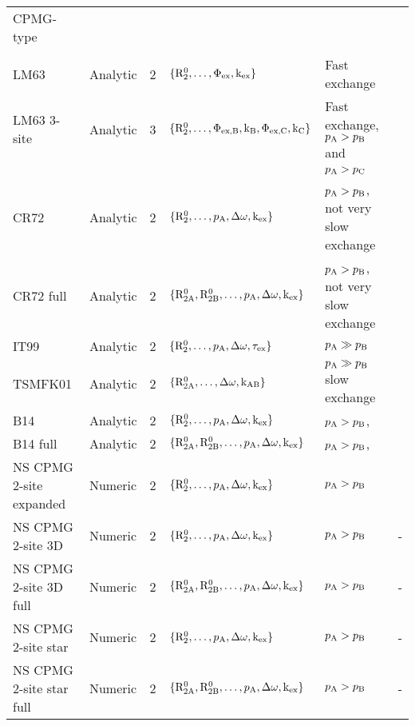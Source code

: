 \begin{center}
\begin{small}
\begin{longtable}{llllll}
\\[-5pt]
CPMG-type \\
\cline{1-1}
\\[-5pt]
LM63                     & Analytic & 2     & $\{\mathrm{R}_2^0, \dots, \Phi_{\textrm{ex}}, \textrm{k}_{\textrm{ex}}\}$                & Fast exchange                     & \citet{LuzMeiboom63} \\
LM63 3-site              & Analytic & 3     & $\{\mathrm{R}_2^0, \dots, \Phi_{\textrm{ex,B}}, \textrm{k}_{\textrm{B}}, \Phi_{\textrm{ex,C}}, \textrm{k}_{\textrm{C}}\}$  & Fast exchange, $p_{\textrm{A}} > p_{\textrm{B}}$ and    & \citet{LuzMeiboom63} \\
                         &          &       &                                                     & $p_{\textrm{A}} > p_{\textrm{C}}$ \\
CR72                     & Analytic & 2     & $\{\mathrm{R}_2^0, \dots, p_{\textrm{A}}, \Delta\omega, \textrm{k}_{\textrm{ex}}\}$              & $p_{\textrm{A}} > p_{\textrm{B}}$, not very slow exchange & \citet{CarverRichards72} \\
CR72 full                & Analytic & 2     & $\{\mathrm{R}_{\mathrm{2A}}^0, \mathrm{R}_{\mathrm{2B}}^0, \dots, p_{\textrm{A}}, \Delta\omega, \textrm{k}_{\textrm{ex}}\}$ & $p_{\textrm{A}} > p_{\textrm{B}}$, not very slow exchange & \citet{CarverRichards72} \\
IT99                     & Analytic & 2     & $\{\mathrm{R}_2^0, \dots, p_{\textrm{A}}, \Delta\omega, \tau_{\textrm{ex}}\}$              & $p_{\textrm{A}} \gg p_{\textrm{B}}$                     & \citet{IshimaTorchia99} \\
TSMFK01                  & Analytic & 2     & $\{\mathrm{R}_{\mathrm{2A}}^0, \dots, \Delta\omega, \textrm{k}_{\textrm{AB}}\}$                  & $p_{\textrm{A}} \gg p_{\textrm{B}}$ slow exchange       & \citet{Tollinger01} \\
B14                      & Analytic & 2     & $\{\mathrm{R}_2^0, \dots, p_{\textrm{A}}, \Delta\omega, \textrm{k}_{\textrm{ex}}\}$              & $p_{\textrm{A}} > p_{\textrm{B}}$,                      & \citet{Baldwin2014} \\
B14 full                 & Analytic & 2     & $\{\mathrm{R}_{\mathrm{2A}}^0, \mathrm{R}_{\mathrm{2B}}^0, \dots, p_{\textrm{A}}, \Delta\omega, \textrm{k}_{\textrm{ex}}\}$ & $p_{\textrm{A}} > p_{\textrm{B}}$,                      & \citet{Baldwin2014} \\
NS CPMG 2-site expanded  & Numeric  & 2     & $\{\mathrm{R}_2^0, \dots, p_{\textrm{A}}, \Delta\omega, \textrm{k}_{\textrm{ex}}\}$              & $p_{\textrm{A}} > p_{\textrm{B}}$                       & \citet{Tollinger01} \\
NS CPMG 2-site 3D        & Numeric  & 2     & $\{\mathrm{R}_2^0, \dots, p_{\textrm{A}}, \Delta\omega, \textrm{k}_{\textrm{ex}}\}$              & $p_{\textrm{A}} > p_{\textrm{B}}$                       & - \\
NS CPMG 2-site 3D full   & Numeric  & 2     & $\{\mathrm{R}_{\mathrm{2A}}^0, \mathrm{R}_{\mathrm{2B}}^0, \dots, p_{\textrm{A}}, \Delta\omega, \textrm{k}_{\textrm{ex}}\}$ & $p_{\textrm{A}} > p_{\textrm{B}}$                       & - \\
NS CPMG 2-site star      & Numeric  & 2     & $\{\mathrm{R}_2^0, \dots, p_{\textrm{A}}, \Delta\omega, \textrm{k}_{\textrm{ex}}\}$              & $p_{\textrm{A}} > p_{\textrm{B}}$                       & - \\
NS CPMG 2-site star full & Numeric  & 2     & $\{\mathrm{R}_{\mathrm{2A}}^0, \mathrm{R}_{\mathrm{2B}}^0, \dots, p_{\textrm{A}}, \Delta\omega, \textrm{k}_{\textrm{ex}}\}$ & $p_{\textrm{A}} > p_{\textrm{B}}$                       & - \\


\end{longtable}
\end{small}
\end{center}
